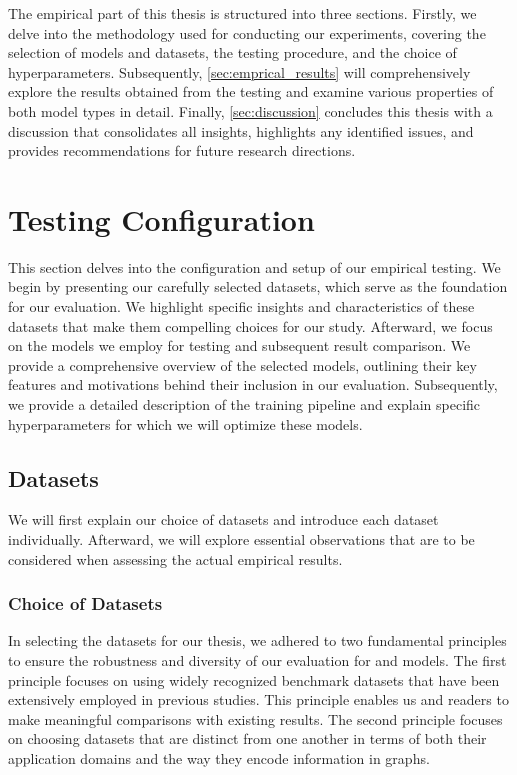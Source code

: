 The empirical part of this thesis is structured into three sections. Firstly, we delve into the methodology used for conducting our experiments, covering the selection of models and datasets, the testing procedure, and the choice of hyperparameters. Subsequently, \cref{sec:emprical_results} will comprehensively explore the results obtained from the testing and examine various properties of both model types in detail. Finally, \cref{sec:discussion} concludes this thesis with a discussion that consolidates all insights, highlights any identified issues, and provides recommendations for future research directions.

\section{Testing Configuration}
This section delves into the configuration and setup of our empirical testing. We begin by presenting our carefully selected datasets, which serve as the foundation for our evaluation. We highlight specific insights and characteristics of these datasets that make them compelling choices for our study. Afterward, we focus on the models we employ for testing and subsequent result comparison. We provide a comprehensive overview of the selected models, outlining their key features and motivations behind their inclusion in our evaluation. Subsequently, we provide a detailed description of the training pipeline and explain specific hyperparameters for which we will optimize these models.

\subsection{Datasets}\label{sec:datasets}
We will first explain our choice of datasets and introduce each dataset individually. Afterward, we will explore essential observations that are to be considered when assessing the actual empirical results.

\subsubsection{Choice of Datasets}
In selecting the datasets for our thesis, we adhered to two fundamental principles to ensure the robustness and diversity of our evaluation for \gnn and \wlnn models. The first principle focuses on using widely recognized benchmark datasets that have been extensively employed in previous studies. This principle enables us and readers to make meaningful comparisons with existing results. The second principle focuses on choosing datasets that are distinct from one another in terms of both their application domains and the way they encode information in graphs.

